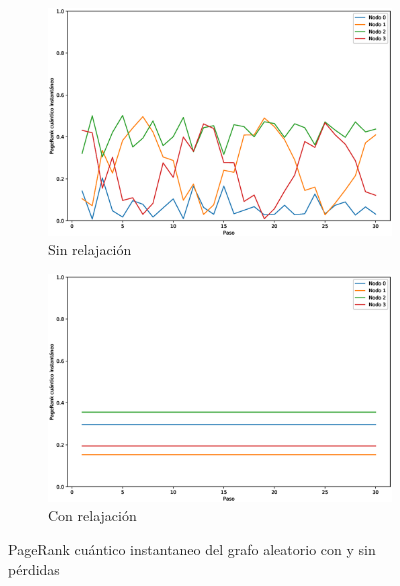 \documentclass[xetex,mathserif,serif]{beamer}
\begin{document}
\begin{frame}
\begin{figure}[H]
    \centering
    \begin{subfigure}[m]{0.45\textwidth}
        \centering
        \includegraphics[width=0.9\linewidth]{img/any-inst-lossless.eps}
        \caption{Sin relajación}
    \end{subfigure}
    \begin{subfigure}[m]{0.45\textwidth}
        \centering
        \includegraphics[width=0.9\linewidth]{img/any-inst-lossy.eps}
        \caption{Con relajación}
    \end{subfigure}
    \caption[PageRank cuántico instantaneo del grafo aleatorio con y sin pérdidas]{PageRank cuántico instantaneo del grafo aleatorio con y sin pérdidas}
    \label{fig:instanylossy}
\end{figure}


\end{frame}
\end{document}
